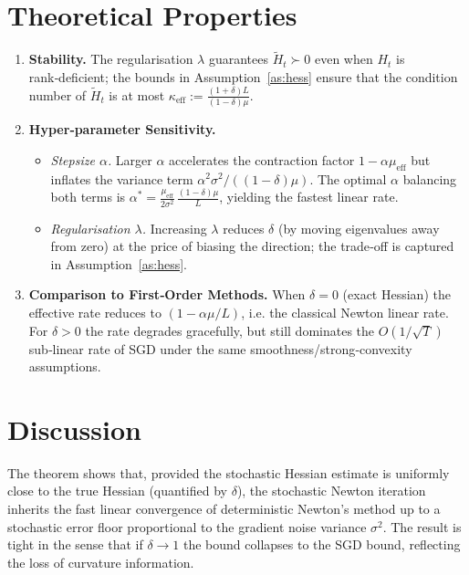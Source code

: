 \documentclass[11pt]{article}
\begin{document}
\section*{Theoretical Properties}
\begin{enumerate}[label=\arabic*.]
\item \textbf{Stability.} The regularisation $\lambda$ guarantees $\widetilde H_{t}\succ0$ even when $H_{t}$ is rank‑deficient; the bounds in Assumption~\ref{as:hess} ensure that the condition number of $\widetilde H_{t}$ is at most $\kappa_{\mathrm{eff}}:=\frac{(1+\delta)L}{(1-\delta)\mu}$.
\item \textbf{Hyper‑parameter Sensitivity.}
    \begin{itemize}
        \item \emph{Stepsize $\alpha$.} Larger $\alpha$ accelerates the contraction factor $1-\alpha\mu_{\mathrm{eff}}$ but inflates the variance term $\alpha^{2}\sigma^{2}/((1-\delta)\mu)$. The optimal $\alpha$ balancing both terms is $\alpha^{*}= \frac{\mu_{\mathrm{eff}}}{2\sigma^{2}}\,\frac{(1-\delta)\mu}{L}$, yielding the fastest linear rate.
        \item \emph{Regularisation $\lambda$.} Increasing $\lambda$ reduces $\delta$ (by moving eigenvalues away from zero) at the price of biasing the direction; the trade‑off is captured in Assumption~\ref{as:hess}.
    \end{itemize}
\item \textbf{Comparison to First‑Order Methods.} When $\delta=0$ (exact Hessian) the effective rate reduces to $(1-\alpha\mu/L)$, i.e. the classical Newton linear rate. For $\delta>0$ the rate degrades gracefully, but still dominates the $O(1/\sqrt{T})$ sub‑linear rate of SGD under the same smoothness/strong‑convexity assumptions.
\end{enumerate}

\section*{Discussion}
The theorem shows that, provided the stochastic Hessian estimate is uniformly close to the true Hessian (quantified by $\delta$), the stochastic Newton iteration inherits the fast linear convergence of deterministic Newton’s method up to a stochastic error floor proportional to the gradient noise variance $\sigma^{2}$. The result is tight in the sense that if $\delta\to1$ the bound collapses to the SGD bound, reflecting the loss of curvature information.
\end{document}

